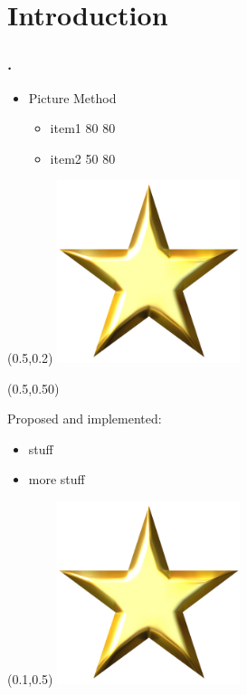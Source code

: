 \documentclass[12pt,t]{beamer}
\begin{document}
\section{Introduction}
\begin{frame}
\frametitle{\thesection.~\insertsection}
\begin{itemize}
\item Picture Method
\begin{itemize}
\item item1 80 80 
\item item2 50 80
\end{itemize}
\end{itemize}

\begin{textblock*}{0.45\textwidth}(0.5\textwidth,0.2\textheight)
\includegraphics[width=0.40\textwidth]{star.jpg}
\end{textblock*}

\begin{textblock*}{0.45\textwidth}(0.5\textwidth,0.50\textheight)
\begin{exampleblock}{}
  Proposed and implemented:
  \begin{itemize}
    \item stuff
    \item more stuff
  \end{itemize}
\end{exampleblock}
\end{textblock*}

\begin{textblock*}{0.45\textwidth}(0.1\textwidth,0.5\textheight)
\includegraphics[width=0.40\textwidth]{star.jpg}
\end{textblock*}

\end{frame}
\end{document}
